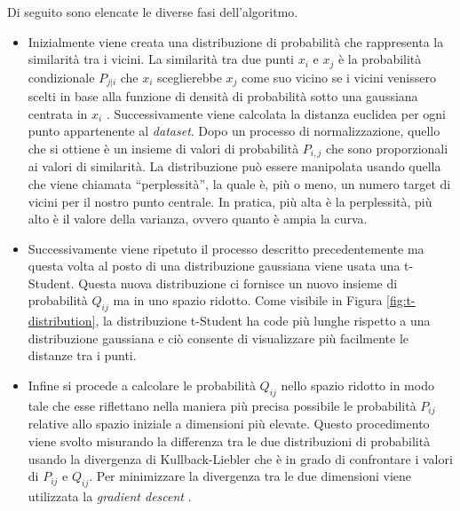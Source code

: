 \documentclass[12pt,italian]{report}
\begin{document}
	Di seguito sono elencate le diverse fasi dell'algoritmo.
	\begin{itemize}
		\item Inizialmente viene creata una distribuzione di probabilità che rappresenta la similarità tra i vicini. La similarità tra due punti $x_i$ e $x_j$ è la probabilità condizionale $P_{j|i}$ che $x_i$ sceglierebbe $x_j$ come suo vicino se i vicini venissero scelti in base alla funzione di densità di probabilità sotto una gaussiana centrata in $x_i$ \cite{van2008visualizing}. Successivamente viene calcolata la distanza euclidea per ogni punto appartenente al \textit{dataset}. Dopo un processo di normalizzazione, quello che si ottiene è un insieme di valori di probabilità $P_{i,j}$ che sono proporzionali ai valori di similarità. La distribuzione può essere manipolata usando quella che viene chiamata ``perplessità'', la quale è, più o meno, un numero target di vicini per il nostro punto centrale. In pratica, più alta è la perplessità, più alto è il valore della varianza, ovvero quanto è ampia la curva. 
		
		\item Successivamente viene ripetuto il processo descritto precedentemente ma questa volta al posto di una distribuzione gaussiana viene usata una t-Student. Questa nuova distribuzione ci fornisce un nuovo insieme di probabilità $Q_{ij}$ ma in uno spazio ridotto. Come visibile in Figura \ref{fig:t-distribution}, la distribuzione t-Student ha code più lunghe rispetto a una distribuzione gaussiana e ciò consente di visualizzare più facilmente le distanze tra i punti.
		
		\item Infine si procede a calcolare le probabilità $Q_{ij}$ nello spazio ridotto in modo tale che esse riflettano nella maniera più precisa possibile le probabilità $P_{ij}$ relative allo spazio iniziale a dimensioni più elevate.  Questo procedimento viene svolto misurando la differenza tra le due distribuzioni di probabilità usando la divergenza di Kullback-Liebler \cite{joyce2011kullback} che è in grado di confrontare i valori di $P_{ij}$ e $Q_{ij}$. Per minimizzare la divergenza tra le due dimensioni viene utilizzata la \textit{gradient descent} \cite{https://doi.org/10.48550/arxiv.1609.04747, van2008visualizing}.
	\end{itemize}
	
\end{document}
